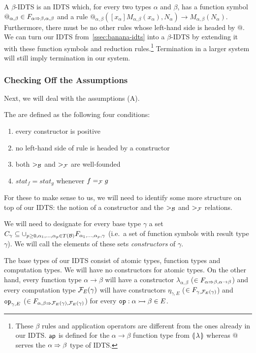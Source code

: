 A $\beta$-IDTS is an IDTS which, for every two types $\alpha$ and $\beta$,
has a function symbol
$@_{\alpha,\beta} \in F_{\alpha \Rightarrow \beta,\alpha,\beta}$ and a rule
$@_{\alpha,\beta}([x_\alpha] M_{\alpha, \beta}(x_\alpha), N_\alpha) \to
M_{\alpha,\beta}(N_\alpha)$. Furthermore, there must be no other rules
whose left-hand side is headed by $@$. We can turn our IDTS
from~\ref{ssec:banana-idts} into a $\beta$-IDTS by extending it with these
function symbols and reduction rules.\footnote{These $\beta$ rules and
  application operators are different from the ones already in our
  IDTS. $\mathsf{ap}$ is defined for the $\alpha \to \beta$ function type from
  $\llparenthesis \, \lambda \, \rrparenthesis$ whereas $@$ serves the $\alpha \Rightarrow \beta$ type of
  IDTS.} Termination in a larger system will still imply termination in our
system.

\subsubsection{Checking Off the Assumptions}

Next, we will deal with the assumptions (A).

\begin{definition}
  The  are defined as the following four conditions:
  \begin{enumerate}
  \item every constructor is positive
  \item no left-hand side of rule is headed by a constructor
  \item both $>_{\mathcal{B}}$ and $>_{\mathcal{F}}$ are well-founded
  \item $stat_f = stat_g$ whenever $f =_{\mathcal{F}} g$
  \end{enumerate}
\end{definition}

For these to make sense to us, we will need to identify some more structure
on top of our IDTS: the notion of a constructor and the $>_{\mathcal{B}}$ and $>_{\mathcal{F}}$
relations.

We will need to designate for every base type $\gamma$ a set
$C_\gamma \subseteq \cup_{p \ge 0, \alpha_1, \ldots, \alpha_p \in T(\mathcal{B})}
F_{\alpha_1, \ldots, \alpha_p, \gamma}$ (i.e.\ a set of function symbols
with result type $\gamma$). We will call the elements of these sets
\emph{constructors} of $\gamma$.

The base types of our IDTS consist of atomic types, function types and
computation types. We will have no constructors for atomic types. On the
other hand, every function type $\alpha \to \beta$ will have a constructor
$\lambda_{\alpha, \beta}$ ($\in F_{\alpha \Rightarrow \beta, \alpha \to \beta}$)
and every computation type $\mathcal{F}_E(\gamma)$ will have constructors
$\eta_{\gamma,E}$ ($\in F_{\gamma,\mathcal{F}_E(\gamma)}$) and $\mathtt{op}_{\gamma,E}$
($\in F_{\alpha,\beta \Rightarrow \mathcal{F}_E(\gamma),\mathcal{F}_E(\gamma)}$) for every
$\mathtt{op} : \alpha \rightarrowtail \beta \in E$.

